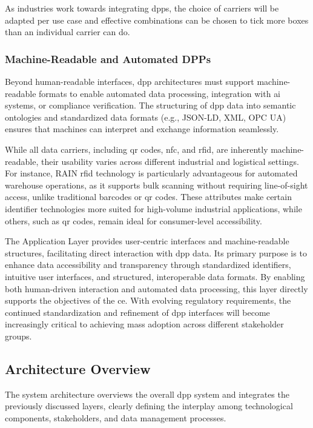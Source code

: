 As industries work towards integrating \ac{dpp}s, the choice of carriers will be adapted per use case and effective combinations can be chosen to tick more boxes than an individual carrier can do. \autocite{ParagonID.n.d.}

\subsubsection*{Machine-Readable and Automated DPPs}
Beyond human-readable interfaces, \ac{dpp} architectures must support machine-readable formats to enable automated data processing, integration with \ac{ai} systems, or compliance verification. The structuring of \ac{dpp} data into semantic ontologies and standardized data formats (e.g., JSON-LD, XML, OPC UA) ensures that machines can interpret and exchange information seamlessly. \autocite{Kebede.2024, Jansen.2025}

While all data carriers, including \ac{qr} codes, \ac{nfc}, and \ac{rfid}, are inherently machine-readable, their usability varies across different industrial and logistical settings. For instance, RAIN \ac{rfid} technology is particularly advantageous for automated warehouse operations, as it supports bulk scanning without requiring line-of-sight access, unlike traditional barcodes or \ac{qr} codes. These attributes make certain identifier technologies more suited for high-volume industrial applications, while others, such as \ac{qr} codes, remain ideal for consumer-level accessibility. \autocite{ParagonID.n.d.}

The Application Layer provides user-centric interfaces and machine-readable structures, facilitating direct interaction with \ac{dpp} data. Its primary purpose is to enhance data accessibility and transparency through standardized identifiers, intuitive user interfaces, and structured, interoperable data formats. By enabling both human-driven interaction and automated data processing, this layer directly supports the objectives of the \acrlong{ce}. With evolving regulatory requirements, the continued standardization and refinement of \ac{dpp} interfaces will become increasingly critical to achieving mass adoption across different stakeholder groups.

\subsection{Architecture Overview}

The system architecture overviews the overall \ac{dpp} system and integrates the previously discussed layers, clearly defining the interplay among technological components, stakeholders, and data management processes. 

